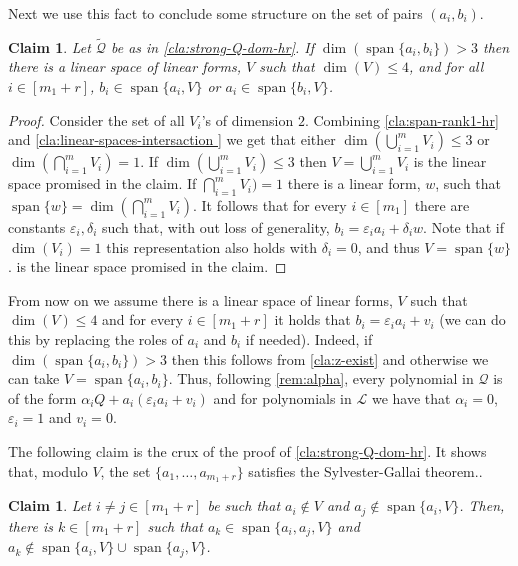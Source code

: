 \documentclass[10pt,a4paper]{article}
\newtheorem{claim}[theorem]{Claim}
\newcommand{\calL}{{\mathcal{L}}}
\newcommand{\cQ}{{\mathcal{Q}}}
\newcommand{\MVar}[2]{{#1}_1,\ldots, {#1}_{#2}}
\newcommand{\spn}[1]{\operatorname{span}\{{#1}\}}
\def\epsilon{\varepsilon}
\begin{document}
Next we use this fact to conclude some structure on the set of pairs $(a_i,b_i)$.
 
\begin{claim}\label{cla:z-exist}
Let $\tilde{\cQ}$ be as in \autoref{cla:strong-Q-dom-hr}. If $\dim(\spn{a_i,b_i})>3$ then there is a linear space of linear forms, $V$ such that $\dim(V) \leq 4$, and for all $i\in [m_1+r]$, $b_i \in \spn{a_i,V}$ or $a_i \in \spn{b_i,V}$. 
\end{claim}

\begin{proof}
Consider the set of all $V_i$'s of dimension $2$. Combining   \autoref{cla:span-rank1-hr} and \autoref{cla:linear-spaces-intersaction } we get that either  $\dim(\bigcup_{i=1}^m V_i) \leq 3$ or $\dim(\bigcap_{i=1}^m V_i) =1$. If $\dim(\bigcup_{i=1}^m V_i) \leq 3$ then $V = \bigcup_{i=1}^m V_i$ is the linear space promised in the claim. If $\bigcap_{i=1}^m V_i) =1$
 there is a linear form, $w$, such that $\spn{w} = \dim(\bigcap_{i=1}^m V_i)$. It follows that for every $ i \in [m_1]$ there are constants $\epsilon_i,\delta_i$ such that, with out loss of generality, $ b_i = \epsilon_i a_i + \delta_i w$. Note that if $\dim(V_i) = 1$ this representation also holds with $\delta_i = 0$, and thus $V = \spn{w}$. is the linear space promised in the claim.
\end{proof}

From now on we assume there is a linear space of linear forms, $V$ such that $\dim(V) \leq 4$ and for every $i \in [m_1+r]$ it holds that $b_i = \epsilon_i a_i + v_i$ (we can do this by replacing the roles of $a_i$ and $b_i$ if needed). Indeed, if $\dim(\spn{a_i,b_i})>3$ then this follows from \autoref{cla:z-exist} and otherwise we can take $V=\spn{a_i,b_i}$. Thus, following \autoref{rem:alpha},  every polynomial in $\cQ$ is of the form $\alpha_i Q + a_i(\epsilon_i a_i +v_i)$ and for polynomials in  $\calL$ we have that $\alpha_i = 0$, $\epsilon_i = 1$ and $ v_i = 0$. 

The following claim is the crux of the proof of \autoref{cla:strong-Q-dom-hr}. It shows that, modulo $V$,  the set $\{\MVar{a}{m_1+r}\}$ satisfies the Sylvester-Gallai theorem..

\begin{claim}\label{cla:stisfy-sg-lines-hr}
Let $i\neq j \in [m_1+r]$ be such that $a_i \notin V$ and $a_j \notin \spn{a_i,V}$. Then, there is $k \in [m_1+r]$ such that $a_k \in \spn{a_i,a_j,V}$ and $a_k \notin \spn{a_i,V}\cup \spn{a_j,V}$.
\end{claim}
\end{document}
